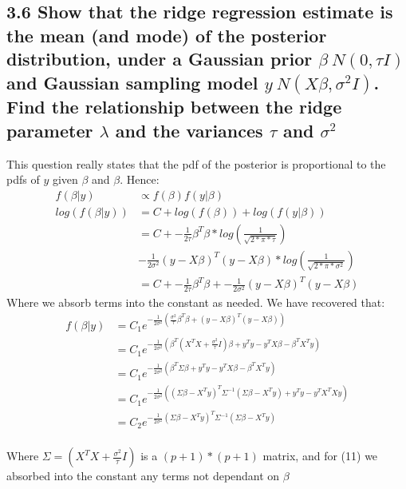 \subsection*{3.6 Show that the ridge regression estimate is the mean (and mode) of the posterior distribution, under a Gaussian prior $\beta ~ N(0, \tau I)$ and Gaussian sampling model $y ~ N(X\beta, \sigma^2 I)$. Find the relationship between the ridge parameter $\lambda$ and the variances $\tau$ and $\sigma^2$}

This question really states that the pdf of the posterior is proportional to the pdfs of $y$ given $\beta$ and $\beta$.
Hence:
\begin{align}
    f(\beta\vert y) &\propto f(\beta) f(y\vert \beta) \\
    log(f(\beta\vert y)) &= C + log(f(\beta)) + log(f(y\vert \beta)) \\
     &= C + -\frac{1}{2\tau}\beta^T \beta * log\left(\frac{1}{\sqrt{2*\pi*\tau}}\right)\\ &-\frac{1}{2\sigma^2}\left(y - X\beta\right) ^T \left(y - X\beta\right) *  log\left(\frac{1}{\sqrt{2*\pi*\sigma^2}}\right) \\ 
     &= C + -\frac{1}{2\tau}\beta^T \beta  +  -\frac{1}{2\sigma^2}\left(y - X\beta\right) ^T \left(y - X\beta\right)
\end{align}
Where we absorb terms into the constant as needed. 
We have recovered that: 
\begin{align}
    f(\beta \vert y) &= C_1e^{ -\frac{1}{2\sigma^2}\left(\frac{\sigma^2}{\tau} \beta^T \beta  +\left(y - X\beta\right) ^T \left(y - X\beta\right)\right)} \\
    &= C_1e^{ -\frac{1}{2\sigma^2}\left(\beta^T\left(X^T X + \frac{\sigma^2}{\tau} I \right) \beta + y^T y - y^T X \beta - \beta^T X^T y\right)}\\
    &= C_1e^{ -\frac{1}{2\sigma^2}\left(\beta^T \Sigma  \beta + y^T y - y^T X \beta - \beta^T X^T y\right)}\\
    &= C_1e^{ -\frac{1}{2\sigma^2}\left(\left(\Sigma\beta - X^T y\right)^T\Sigma^{-1}   \left(\Sigma\beta - X^T y\right) + y^T y - y^T X^T X y\right)}\\
    &= C_2e^{ -\frac{1}{2\sigma^2}\left(\Sigma\beta - X^T y\right)^T\Sigma^{-1}   \left(\Sigma\beta - X^T y\right)}\\
\end{align}

Where $\Sigma = \left(X^T X + \frac{\sigma^2}{\tau} I \right)$ is a $(p+1) * (p+1)$ matrix, and for (11) we absorbed into the constant any terms not dependant on $\beta$
 
